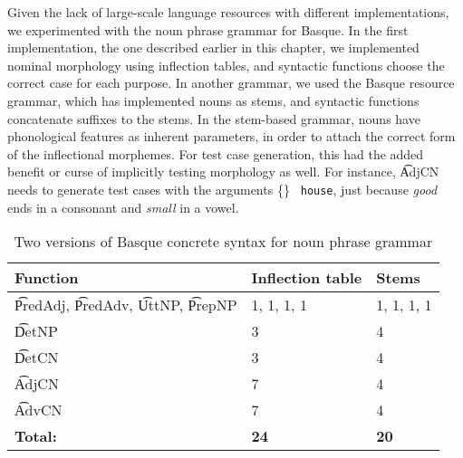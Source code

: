 Given the lack of large-scale language resources with different
implementations, we experimented with the noun phrase grammar for
Basque. In the first implementation, the one described earlier in this
chapter, we implemented nominal morphology using inflection tables,
and syntactic functions choose the correct case for each purpose. In
another grammar, we used the Basque resource grammar, which has
implemented nouns as stems, and syntactic functions concatenate
suffixes to the stems.  In the stem-based grammar, nouns have
phonological features as inherent parameters, in order to attach the
correct form of the inflectional morphemes. For test case generation,
this had the added benefit or curse of implicitly testing morphology
as well. For instance, \t{AdjCN} needs to generate test cases with the
arguments \{\} {\tt
  house}, just because \emph{good} ends in a consonant and
\emph{small} in a vowel. 

\begin{table}[h]

\centering
\begin{tabular}{| p{2.3cm} | l | l |}
\hline
{\bf Function} & {\bf Inflection table}
   & {\bf Stems} \\ \hline
 
\t{PredAdj}, \t{PredAdv}, \t{UttNP}, \t{PrepNP}  & 1, 1, 1, 1 & 1, 1,
                                                                1, 1
  \\ \hline
\t{DetNP}    & 3 & 4   \\ \hline
\t{DetCN}    & 3 & 4   \\ \hline
\t{AdjCN}    & 7 & 4   \\ \hline
\t{AdvCN}    & 7 & 4   \\ \hline
{\bf Total:} & {\bf 24} & {\bf 20} \\ 
\hline
\end{tabular}
\caption{Two versions of Basque concrete syntax for noun phrase grammar}
\label{basque_versions}
\end{table}

